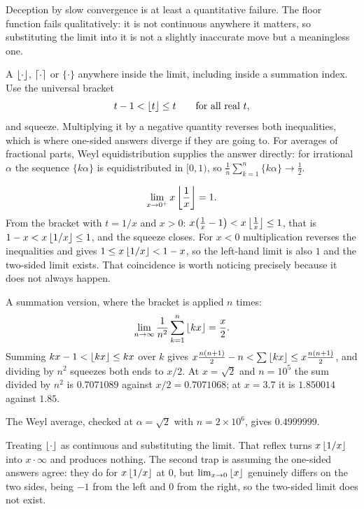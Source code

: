 Deception by slow convergence is at least a quantitative failure. The floor function fails qualitatively: it is not continuous anywhere it matters, so substituting the limit into it is not a slightly inaccurate move but a meaningless one.

\cue A $\left\lfloor \cdot\right\rfloor$, $\left\lceil \cdot\right\rceil$ or $\{\cdot\}$ anywhere inside the limit, including inside a summation index.
\method Use the universal bracket
\[t-1<\left\lfloor t\right\rfloor\leq t\qquad\text{for all real }t,\]
and squeeze. Multiplying it by a negative quantity reverses both inequalities, which is where one-sided answers diverge if they are going to. For averages of fractional parts, Weyl equidistribution supplies the answer directly: for irrational $\alpha$ the sequence $\{k\alpha\}$ is equidistributed in $[0,1)$, so $\frac1n\sum_{k=1}^{n}\{k\alpha\}\to\tfrac12$.

\begin{worked}
\[\lim_{x\to0^{+}}x\left\lfloor \frac1x\right\rfloor=1 .\]
From the bracket with $t=1/x$ and $x>0$: $x\bigl(\tfrac1x-1\bigr)<x\left\lfloor \tfrac1x\right\rfloor\leq1$, that is $1-x<x\left\lfloor 1/x\right\rfloor\leq1$, and the squeeze closes. For $x<0$ multiplication reverses the inequalities and gives $1\leq x\left\lfloor 1/x\right\rfloor<1-x$, so the left-hand limit is also $1$ and the two-sided limit exists. That coincidence is worth noticing precisely because it does not always happen.

A summation version, where the bracket is applied $n$ times:
\[\lim_{n\to\infty}\frac{1}{n^{2}}\sum_{k=1}^{n}\left\lfloor kx\right\rfloor=\frac x2 .\]
Summing $kx-1<\left\lfloor kx\right\rfloor\leq kx$ over $k$ gives $x\tfrac{n(n+1)}{2}-n<\sum\left\lfloor kx\right\rfloor\leq x\tfrac{n(n+1)}{2}$, and dividing by $n^{2}$ squeezes both ends to $x/2$. At $x=\sqrt2$ and $n=10^{5}$ the sum divided by $n^{2}$ is $0.7071089$ against $x/2=0.7071068$; at $x=3.7$ it is $1.850014$ against $1.85$.

The Weyl average, checked at $\alpha=\sqrt2$ with $n=2\times10^{6}$, gives $0.4999999$.
\end{worked}

\begin{trap}
Treating $\left\lfloor \cdot\right\rfloor$ as continuous and substituting the limit. That reflex turns $x\left\lfloor 1/x\right\rfloor$ into $x\cdot\infty$ and produces nothing. The second trap is assuming the one-sided answers agree: they do for $x\left\lfloor 1/x\right\rfloor$ at $0$, but $\lim_{x\to0}\left\lfloor x\right\rfloor$ genuinely differs on the two sides, being $-1$ from the left and $0$ from the right, so the two-sided limit does not exist.
\end{trap}

